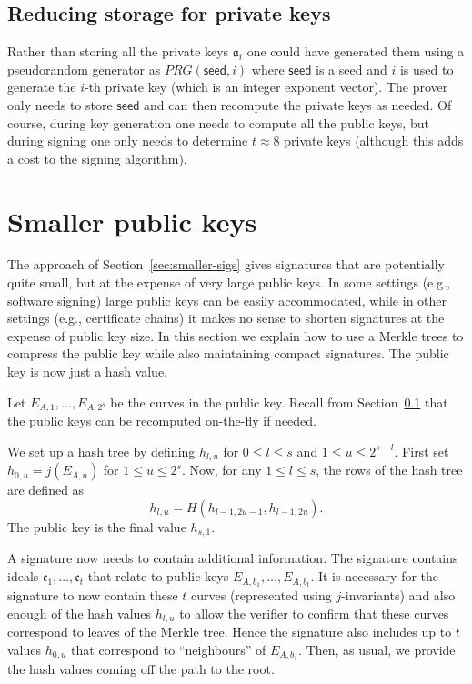 \documentclass{llncs}
\newcommand{\seed}{\textsf{seed}}
\renewcommand{\a}{\mathfrak{a}}
\renewcommand{\c}{\mathfrak{c}}
\begin{document}
\subsection{Reducing storage for private keys}\label{sec:private-key-compress}

Rather than storing all the private keys $\a_i$ one could have generated them using a pseudorandom generator as $PRG( \seed, i )$ where $\seed$ is a seed and $i$ is used to generate the $i$-th private key (which is an integer exponent vector).
The prover only needs to store $\seed$ and can then recompute the private keys as needed.
Of course, during key generation one needs to compute all the public keys, but during signing one only needs to determine $t \approx 8$ private keys (although this adds a cost to the signing algorithm).





\section{Smaller public keys} \label{sec:smaller-keys}

The approach of Section~\ref{sec:smaller-sigs} gives signatures that are potentially quite small, but at the expense of very large public keys. In some settings (e.g., software signing) large public keys can be easily accommodated, while in other settings (e.g., certificate chains) it makes no sense to shorten signatures at the expense of public key size.
In this section we explain how to use a Merkle trees to compress the public key while also maintaining compact signatures.
The public key is now just a hash value.

Let $E_{A,1}, \dots, E_{A,2^s}$ be the curves in the public key.
Recall from Section~\ref{sec:private-key-compress} that the public keys can be recomputed on-the-fly if needed.


We set up a hash tree by defining $h_{l,u}$ for $0 \le l \le s$ and $1 \le u \le 2^{s-l}$.
First set $h_{0,u} = j( E_{A,u} )$ for $1 \le u \le 2^s$.
Now, for any $1 \le l \le s$, the rows of the hash tree are defined as
\[
   h_{l,u} = H( h_{l-1,2u-1}, h_{l-1,2u} ).
\]
The public key is the final value $h_{s,1}$.


A signature now needs to contain additional information.
The signature contains ideals $\c_1, \dots, \c_t$ that relate to public keys $E_{A,b_1}, \dots, E_{A,b_t}$. It is necessary for the signature to now contain these $t$ curves (represented using $j$-invariants) and also enough of the hash values $h_{l,u}$ to allow the verifier to confirm that these curves correspond to leaves of the Merkle tree.
Hence the signature also includes up to $t$ values $h_{0,u}$ that correspond to ``neighbours'' of $E_{A,b_1}$.
Then, as usual, we provide the hash values coming off the path to the root.
\end{document}
